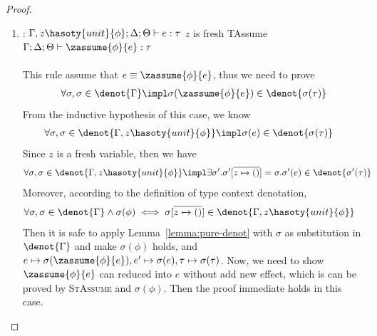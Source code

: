 \begin{proof}
\begin{enumerate}[label=Case]
\item:
{\footnotesize
\mprooftr{50mm}
{$\Gamma, z\hasoty{unit}{\phi};\Delta;\Theta \vdash e : \tau$ \quad $z$ is fresh}
{TAssume}
{$\Gamma;\Delta;\Theta  \vdash \zassume{\phi}{e} : \tau  $}
\ \\ \ \\}
This rule assume that $e \equiv \zassume{\phi}{e}$, thus we need to prove
{\footnotesize\begin{align*}
    \forall \sigma, \sigma \in \denot{\Gamma} \impl \sigma(\zassume{\phi}{e}) \in \denot{\sigma(\tau)}
\end{align*}}\noindent
From the inductive hypothesis of this case, we know
{\footnotesize\begin{align*}
    &\forall \sigma, \sigma \in \denot{\Gamma, z\hasoty{unit}{\phi}} \impl \sigma(e) \in \denot{\sigma(\tau)}
\end{align*}}\noindent
Since $z$ is a fresh variable, then we have
{\footnotesize\begin{align*}
    &\forall \sigma, \sigma \in \denot{\Gamma, z\hasoty{unit}{\phi}} \impl \exists \sigma'. \sigma'[\overline{z \mapsto ()}] = \sigma. \sigma'(e) \in \denot{\sigma'(\tau)}
\end{align*}}\noindent
Moreover, according to the definition of type context denotation,
{\footnotesize\begin{align*}
    &\forall \sigma, \sigma \in \denot{\Gamma} \land \sigma(\phi) \iff \sigma[\overline{z \mapsto ()}] \in \denot{\Gamma, z\hasoty{unit}{\phi}}
\end{align*}}\noindent
Then it is safe to apply Lemma~\ref{lemma:pure-denot} with $\sigma$ as substitution in $\denot{\Gamma}$ and make $\sigma(\phi)$ holds, and $e \mapsto \sigma(\zassume{\phi}{e}), e' \mapsto \sigma(e), \tau \mapsto \sigma(\tau)$.
Now, we need to show $\zassume{\phi}{e}$ can reduced into $e$ without add new effect, which is can be proved by \textsc{StAssume} and $\sigma(\phi)$. Then the proof immediate holds in this case.


\end{enumerate}
\end{proof}
